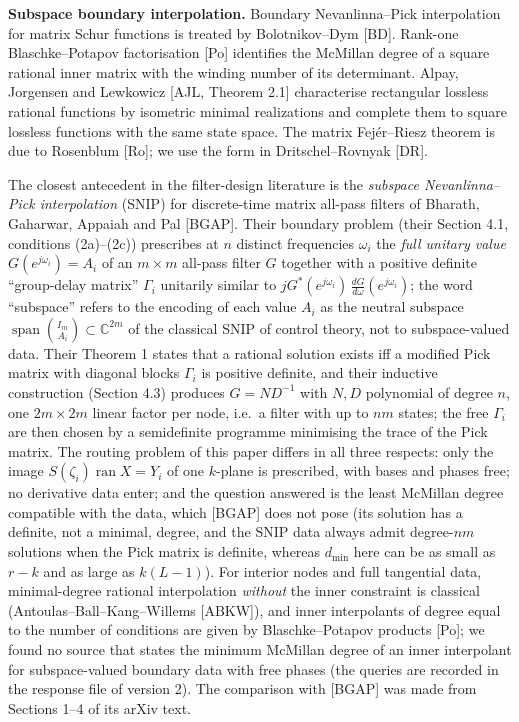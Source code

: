 \documentclass[
  11pt,
  a4paper,
]{article}
\begin{document}
\textbf{Subspace boundary interpolation.} Boundary Nevanlinna--Pick
interpolation for matrix Schur functions is treated by Bolotnikov--Dym
{[}BD{]}. Rank-one Blaschke--Potapov factorisation {[}Po{]} identifies
the McMillan degree of a square rational inner matrix with the winding
number of its determinant. Alpay, Jorgensen and Lewkowicz {[}AJL,
Theorem 2.1{]} characterise rectangular lossless rational functions by
isometric minimal realizations and complete them to square lossless
functions with the same state space. The matrix Fejér--Riesz theorem is
due to Rosenblum {[}Ro{]}; we use the form in Dritschel--Rovnyak
{[}DR{]}.

The closest antecedent in the filter-design literature is the
\emph{subspace Nevanlinna--Pick interpolation} (SNIP) for discrete-time
matrix all-pass filters of Bharath, Gaharwar, Appaiah and Pal
{[}BGAP{]}. Their boundary problem (their Section 4.1, conditions
(2a)--(2c)) prescribes at \(n\) distinct frequencies \(\omega_i\) the
\emph{full unitary value} \(G(e^{j\omega_i})=A_i\) of an \(m\times m\)
all-pass filter \(G\) together with a positive definite ``group-delay
matrix'' \(\Gamma_i\) unitarily similar to
\(jG^*(e^{j\omega_i})\,\allowbreak{}\tfrac{dG}{d\omega}(e^{j\omega_i})\); the word
``subspace'' refers to the encoding of each value \(A_i\) as the neutral
subspace \(\operatorname{span}\binom{I_m}{A_i}\subset\mathbb C^{2m}\) of
the classical SNIP of control theory, not to subspace-valued data. Their
Theorem 1 states that a rational solution exists iff a modified Pick
matrix with diagonal blocks \(\Gamma_i\) is positive definite, and their
inductive construction (Section 4.3) produces \(G=ND^{-1}\) with \(N,\allowbreak{}D\)
polynomial of degree \(n\), one \(2m\times2m\) linear factor per node,
i.e.~a filter with up to \(nm\) states; the free \(\Gamma_i\) are then
chosen by a semidefinite programme minimising the trace of the Pick
matrix. The routing problem of this paper differs in all three respects:
only the image \(S(\zeta_i)\operatorname{ran}X=Y_i\) of one \(k\)-plane
is prescribed, with bases and phases free; no derivative data enter; and
the question answered is the least McMillan degree compatible with the
data, which {[}BGAP{]} does not pose (its solution has a definite, not a
minimal, degree, and the SNIP data always admit degree-\(nm\) solutions
when the Pick matrix is definite, whereas \(d_{\min}\) here can be as
small as \(r-k\) and as large as \(k(L-1)\)). For interior nodes and
full tangential data, minimal-degree rational interpolation
\emph{without} the inner constraint is classical
(Antoulas--Ball--Kang--Willems {[}ABKW{]}), and inner interpolants of
degree equal to the number of conditions are given by Blaschke--Potapov
products {[}Po{]}; we found no source that states the minimum McMillan
degree of an inner interpolant for subspace-valued boundary data with
free phases (the queries are recorded in the response file of version
2). The comparison with {[}BGAP{]} was made from Sections 1--4 of its
arXiv text.
\end{document}
